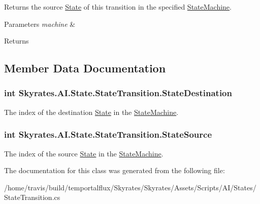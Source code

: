 Returns the source \hyperlink{class_skyrates_1_1_a_i_1_1_state_1_1_state}{State} of this transition in the specified \hyperlink{class_skyrates_1_1_a_i_1_1_state_1_1_state_machine}{State\-Machine}. 


\begin{DoxyParams}{Parameters}
{\em machine} & \\
\hline
\end{DoxyParams}
\begin{DoxyReturn}{Returns}

\end{DoxyReturn}


\subsection{Member Data Documentation}
\hypertarget{class_skyrates_1_1_a_i_1_1_state_1_1_state_transition_a445177b14011fbc85aec78ecd04680f8}{
\subsubsection[{State\-Destination}]{\setlength{\rightskip}{0pt plus 5cm}int Skyrates.\-A\-I.\-State.\-State\-Transition.\-State\-Destination}}\label{class_skyrates_1_1_a_i_1_1_state_1_1_state_transition_a445177b14011fbc85aec78ecd04680f8}


The index of the destination \hyperlink{class_skyrates_1_1_a_i_1_1_state_1_1_state}{State} in the \hyperlink{class_skyrates_1_1_a_i_1_1_state_1_1_state_machine}{State\-Machine}. 

\hypertarget{class_skyrates_1_1_a_i_1_1_state_1_1_state_transition_a15c97c73b5e83f2bda77c5f4fb2521c6}{
\subsubsection[{State\-Source}]{\setlength{\rightskip}{0pt plus 5cm}int Skyrates.\-A\-I.\-State.\-State\-Transition.\-State\-Source}}\label{class_skyrates_1_1_a_i_1_1_state_1_1_state_transition_a15c97c73b5e83f2bda77c5f4fb2521c6}


The index of the source \hyperlink{class_skyrates_1_1_a_i_1_1_state_1_1_state}{State} in the \hyperlink{class_skyrates_1_1_a_i_1_1_state_1_1_state_machine}{State\-Machine}. 



The documentation for this class was generated from the following file\-:\begin{DoxyCompactItemize}
\item 
/home/travis/build/temportalflux/\-Skyrates/\-Skyrates/\-Assets/\-Scripts/\-A\-I/\-States/State\-Transition.\-cs\end{DoxyCompactItemize}
